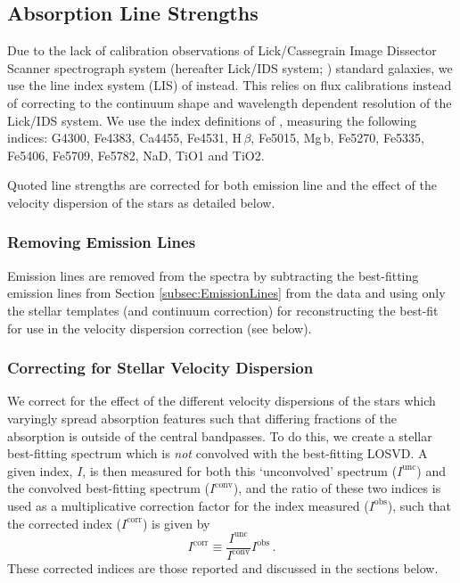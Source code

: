 \documentclass[a4paper,fleqn,usenatbib]{mnras}
\begin{document}
	\subsection{Absorption Line Strengths}
		\label{subsec:absorption}
		Due to the lack of calibration observations of Lick/Cassegrain Image Dissector Scanner spectrograph system (hereafter Lick/IDS system; \citealt{Faber1985, Worthey1994}) standard galaxies, we use the line index system (LIS) of \citet{Vazdekis2010} instead. This relies on flux calibrations instead of correcting to the continuum shape and wavelength dependent resolution of the Lick/IDS system. We use the index definitions of \citet{Trager1998}, measuring the following indices: G4300, Fe4383, Ca4455, Fe4531, H\,$\beta$, Fe5015, Mg\,b, Fe5270, Fe5335, Fe5406, Fe5709, Fe5782, NaD, TiO1 and TiO2. %

		Quoted line strengths are corrected for both emission line and the effect of the velocity dispersion of the stars as detailed below.

		\subsubsection{Removing Emission Lines}
			Emission lines are removed from the spectra by subtracting the best-fitting emission lines from Section \ref{subsec:EmissionLines} from the data and using only the stellar templates (and continuum correction) for reconstructing the best-fit for use in the velocity dispersion correction (see below).

		\subsubsection{Correcting for Stellar Velocity Dispersion}
			\label{subsubsec:EmissionFit}
			We correct for the effect of the different velocity dispersions of the stars which varyingly spread absorption features such that differing fractions of the absorption is outside of the central bandpasses. To do this, we create a stellar best-fitting spectrum which is \textit{not} convolved with the best-fitting LOSVD. A given index, $I$, is then measured for both this `unconvolved' spectrum ($I^\text{unc}$) and the convolved best-fitting spectrum ($I^\text{conv}$), and the ratio of these two indices is used as a multiplicative correction factor for the index measured ($I^\text{obs}$), such that the corrected index ($I^\text{corr}$) is given by
			\begin{equation}
				I^\text{corr} \equiv \frac{I^\text{unc}}{I^\text{conv}} I^\text{obs} \, .
			\end{equation}
			These corrected indices are those reported and discussed in the sections below.
\end{document}
